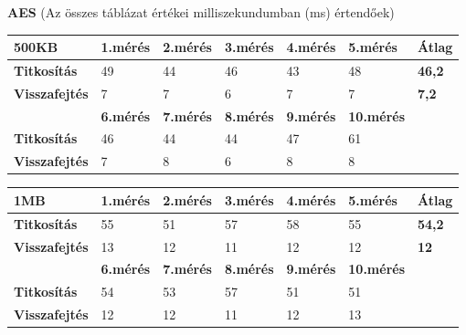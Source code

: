 \newpage \noindent \textbf{AES} (Az összes táblázat értékei milliszekundumban (ms) értendőek)

\begin{center}
	
	
	\begin{tabular}{|p{2.4cm}|p{1.7cm}|p{1.7cm}|p{1.7cm}|p{1.7cm}|p{1.8cm}|p{1.2cm}|}
		\hline
		\textbf{500KB} & \textbf{1.mérés} & \textbf{2.mérés} & \textbf{3.mérés} & \textbf{4.mérés} & \textbf{5.mérés} & \textbf{Átlag} \\
		\hline
		\textbf{Titkosítás} & 49 & 44 & 46 & 43 & 48 & \textbf{46,2} \\
		\hline
		\textbf{Visszafejtés} & 7 & 7 & 6 & 7 & 7 & \textbf{7,2} \\
		\hline
		 & \textbf{6.mérés} & \textbf{7.mérés} & \textbf{8.mérés} & \textbf{9.mérés} & \textbf{10.mérés} & \\
		 \hline
		 \textbf{Titkosítás} & 46 & 44 & 44 & 47 & 61 & \\
		 \hline
		 \textbf{Visszafejtés} & 7 & 8 & 6 & 8 & 8 &\\
		 \hline
	\end{tabular}
\end{center}

\begin{center}
	
	
	\begin{tabular}{|p{2.4cm}|p{1.7cm}|p{1.7cm}|p{1.7cm}|p{1.7cm}|p{1.8cm}|p{1.2cm}|}
		\hline
		\textbf{1MB} & \textbf{1.mérés} & \textbf{2.mérés} & \textbf{3.mérés} & \textbf{4.mérés} & \textbf{5.mérés} & \textbf{Átlag} \\
		\hline
		\textbf{Titkosítás} & 55 & 51 & 57 & 58 & 55 &\textbf{54,2} \\
		\hline
		\textbf{Visszafejtés} &13 & 12 & 11 & 12 & 12 &	\textbf{12}  \\
		\hline
		& \textbf{6.mérés} & \textbf{7.mérés} & \textbf{8.mérés} & \textbf{9.mérés} & \textbf{10.mérés} & \\
		\hline
		\textbf{Titkosítás} & 54 & 53 & 57 & 51 & 51 & \\
		\hline
		\textbf{Visszafejtés} & 12 & 12 & 11 & 12 & 13 & \\
		\hline
	\end{tabular}
\end{center}

